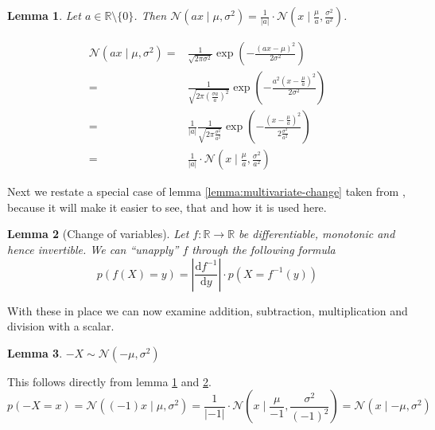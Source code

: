\documentclass[11pt,a4paper]{book}
\newtheorem{lemma}{Lemma}
\begin{document}
\begin{lemma}
  \label{lemma:gaussian-parameter-scaling}
  Let $a \in \mathbb{R} \setminus \{ 0 \}$. Then
  $\mathcal{N}(ax \mid \mu, \sigma^{2}) = \frac{1}{|a|} \cdot \mathcal{N}\left(x \mid
  \frac{\mu}{a}, \frac{\sigma^{2}}{a^{2}}\right)$.
\end{lemma}
\begin{proof2}
  \begin{align*}
    \mathcal{N}(ax \mid \mu, \sigma^{2}) = & \frac{1}{\sqrt{2 \pi \sigma^{2}}} \exp\left( -\frac{\left(ax - \mu \right)^{2}}{2\sigma^{2}} \right)\\
    = & \frac{1}{\sqrt{2 \pi \left( \frac{\sigma a}{a} \right)^{2}}} \exp\left( -\frac{a^{2}\left(x - \frac{\mu}{a} \right)^{2}}{2\sigma^{2}} \right)\\
    = & \frac{1}{|a|} \frac{1}{\sqrt{2 \pi \frac{\sigma^{2}}{a^{2}}}} \exp\left( -\frac{\left(x - \frac{\mu}{a} \right)^{2}}{2 \frac{\sigma^{2}}{a^{2}}} \right)\\
    = & \frac{1}{|a|} \cdot \mathcal{N}\left( x \mid \frac{\mu}{a}, \frac{\sigma^{2}}{a^{2}} \right)
  \end{align*}
\end{proof2}

Next we restate a special case of lemma \ref{lemma:multivariate-change} taken
from \cite[chapter~2.6.2]{murphy}, because it will make it easier to see, that
and how it is used here.
\begin{lemma}[Change of variables]
  \label{lemma:change}
  Let $f : \mathbb{R} \rightarrow \mathbb{R}$ be differentiable, monotonic and
  hence invertible. We can ``unapply'' $f$ through the following formula
  \begin{equation*}
    p(f(X) = y) = \left| \frac{\mathrm{d}f^{-1}}{\mathrm{d}y} \right| \cdot p(X = f^{-1}(y))
  \end{equation*}
\end{lemma}

With these in place we can now examine addition, subtraction, multiplication and
division with a scalar.

\vspace{1em}

\begin{lemma}
  $-X \sim \mathcal{N}(-\mu, \sigma^{2})$
\end{lemma}
\begin{proof2}
  This follows directly from lemma \ref{lemma:gaussian-parameter-scaling} and
  \ref{lemma:change}.
  \begin{equation*}
    p(-X = x) = \mathcal{N}((-1)x \mid \mu, \sigma^{2}) = \frac{1}{|{-1}|} \cdot \mathcal{N}\left( x \mid \frac{\mu}{{-1}}, \frac{\sigma^{2}}{({-1})^{2}} \right) = \mathcal{N}(x \mid {-\mu}, \sigma^{2})
  \end{equation*}
\end{proof2}
\end{document}
